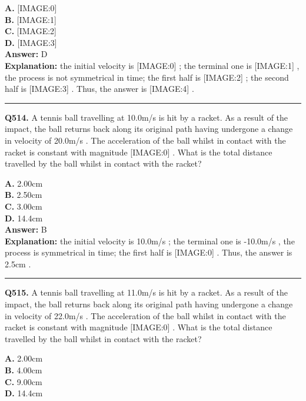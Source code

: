 \documentclass[12pt]{article}
\begin{document}
\textbf{A.} [IMAGE:0] \\
\textbf{B.} [IMAGE:1] \\
\textbf{C.} [IMAGE:2] \\
\textbf{D.} [IMAGE:3] \\

\textbf{Answer:} D \\
\textbf{Explanation:} the initial velocity is
[IMAGE:0]
; the terminal one is
[IMAGE:1]
, the process is not symmetrical in time; the first half is
[IMAGE:2]
; the second half is
[IMAGE:3]
. Thus, the answer is
[IMAGE:4]
.

\hrule
\vspace{1em}


\noindent
\textbf{Q514.} A tennis ball travelling at 10.0m/s
is hit by a racket. As a result of the impact, the ball returns back along its original path having undergone a change in velocity of 20.0m/s
. The acceleration of the ball whilst in contact with the racket is constant with magnitude
[IMAGE:0]
.
What is the total distance travelled by the ball whilst in contact with the racket?



\textbf{A.} 2.00cm \\
\textbf{B.} 2.50cm \\
\textbf{C.} 3.00cm \\
\textbf{D.} 14.4cm \\

\textbf{Answer:} B \\
\textbf{Explanation:} the initial velocity is 10.0m/s
; the terminal one is -10.0m/s
, the process is symmetrical in time; the first half is
[IMAGE:0]
. Thus, the answer is 2.5cm
.

\hrule
\vspace{1em}


\noindent
\textbf{Q515.} A tennis ball travelling at 11.0m/s
is hit by a racket. As a result of the impact, the ball returns back along its original path having undergone a change in velocity of 22.0m/s
. The acceleration of the ball whilst in contact with the racket is constant with magnitude
[IMAGE:0]
.
What is the total distance travelled by the ball whilst in contact with the racket?



\textbf{A.} 2.00cm \\
\textbf{B.} 4.00cm \\
\textbf{C.} 9.00cm \\
\textbf{D.} 14.4cm \\
\end{document}
